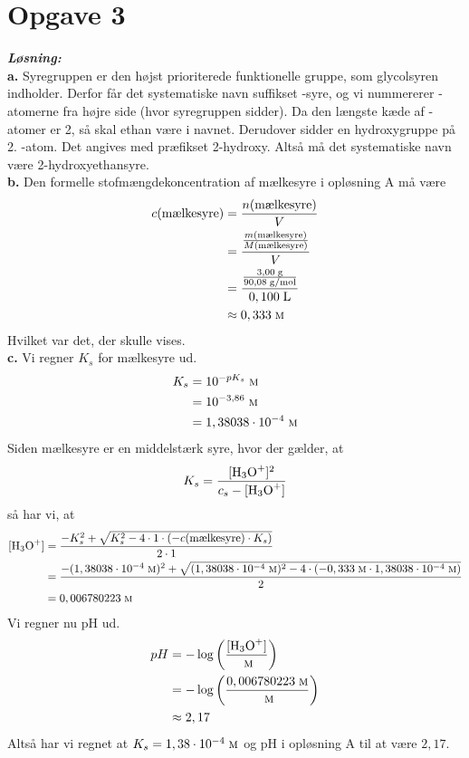 \documentclass{report}
\newcommand{\sol}{\setlength{\parindent}{0cm}\textbf{\textit{Løsning:}}\setlength{\parindent}{1cm}}
\begin{document}
\section*{Opgave 3}
\sol \\
\textbf{a.}
Syregruppen er den højst prioriterede funktionelle gruppe, som glycolsyren indholder. 
Derfor får det systematiske navn suffikset -syre, og vi nummererer -atomerne fra højre side (hvor syregruppen sidder).
Da den længste kæde af -atomer er 2, så skal ethan være i navnet.
Derudover sidder en hydroxygruppe på 2. -atom. 
Det angives med præfikset 2-hydroxy.
Altså må det systematiske navn være 2-hydroxyethansyre.\\[1ex]
\textbf{b.}
Den formelle stofmængdekoncentration af mælkesyre i opløsning A må være 
\begin{equation*}
\begin{split}
  c(\text{mælkesyre} )&= \frac{n(\text{mælkesyre} )}{V}\\ 
  &=\frac{\frac{m(\text{mælkesyre} )}{M(\text{mælkesyre} )}}{V}\\ 
  &=\frac{\frac{3,00 \;\unit{g} }{90,08 \;\unit{g/mol} }}{0,100 \;\unit{L} }\\ 
  &\approx 0,333 \;\unit{\textsc{m}} 
\end{split}
\end{equation*}
Hvilket var det, der skulle vises.\\[1ex]
\textbf{c.}
Vi regner $K_s$ for mælkesyre ud. 
\begin{equation*}
\begin{split}
  K_s&=10^{-pK_s} \;\unit{\textsc{m}} \\ 
  &=10^{-3,86} \;\unit{\textsc{m}} \\ 
  &=1,38038 \cdot 10^{-4} \;\unit{\textsc{m}} 
\end{split}
\end{equation*}
Siden mælkesyre er en middelstærk syre, hvor der gælder, at
\[
K_s=\frac{[\ce{H3O+} ]^2}{c_s - [\ce{ H3O+}]}
\] 
så har vi, at 
\begin{equation*}
\begin{split}
  [\ce{H3O+}]&=\frac{-K_s^2 + \sqrt{K_s^2- 4 \cdot 1 \cdot (-c(\text{mælkesyre} ) \cdot K_s)} }{2 \cdot 1}\\ 
  &=\frac{-(1,38038 \cdot 10^{-4} \;\unit{\textsc{m}})^2 + \sqrt{(1,38038 \cdot 10^{-4} \;\unit{\textsc{m}})^2- 4\cdot (-0,333 \;\unit{\textsc{m}}  \cdot 1,38038 \cdot 10^{-4} \;\unit{\textsc{m}})} }{2}\\ 
  &=0,006780223 \;\unit{\textsc{m}} 
\end{split}
\end{equation*}
Vi regner nu pH ud.
\begin{equation*}
\begin{split}
  pH&=-\log \left(\frac{[\ce{H3O+} ]}{\;\unit{\textsc{m}} }\right) \\ 
  &=-\log \left(\frac{0,006780223 \;\unit{\textsc{m}} }{\;\unit{\textsc{m}} }\right) \\ 
  &\approx 2,17
\end{split}
\end{equation*}
Altså har vi regnet at $K_s=1,38 \cdot 10^{-4} \;\unit{\textsc{m}} $ og pH i opløsning A til at være $2,17$. 
\end{document}
